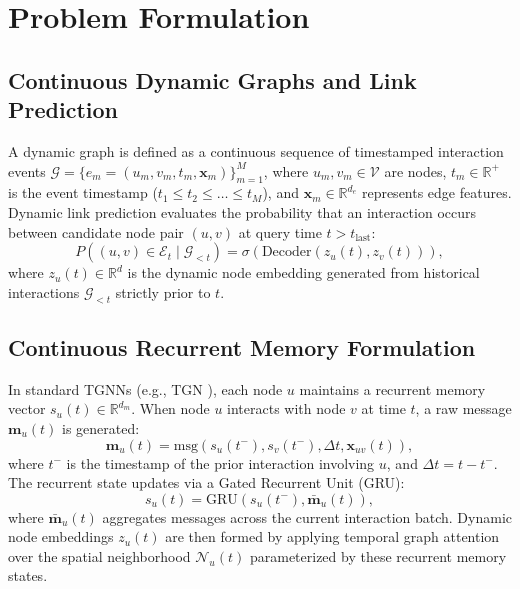 \section{Problem Formulation}
\label{sec:problem_formulation}

\subsection{Continuous Dynamic Graphs and Link Prediction}
A dynamic graph is defined as a continuous sequence of timestamped interaction events $\mathcal{G} = \{e_m = (u_m, v_m, t_m, \mathbf{x}_m)\}_{m=1}^M$, where $u_m, v_m \in \mathcal{V}$ are nodes, $t_m \in \mathbb{R}^+$ is the event timestamp ($t_1 \le t_2 \le \dots \le t_M$), and $\mathbf{x}_m \in \mathbb{R}^{d_e}$ represents edge features. Dynamic link prediction evaluates the probability that an interaction occurs between candidate node pair $(u, v)$ at query time $t > t_{\text{last}}$:
\begin{equation}
    P((u, v) \in \mathcal{E}_{t} \mid \mathcal{G}_{< t}) = \sigma(\text{Decoder}(z_u(t), z_v(t))),
\end{equation}
where $z_u(t) \in \mathbb{R}^d$ is the dynamic node embedding generated from historical interactions $\mathcal{G}_{< t}$ strictly prior to $t$.

\subsection{Continuous Recurrent Memory Formulation}
In standard TGNNs (e.g., TGN \citep{rossi2020temporal}), each node $u$ maintains a recurrent memory vector $s_u(t) \in \mathbb{R}^{d_m}$. When node $u$ interacts with node $v$ at time $t$, a raw message $\mathbf{m}_u(t)$ is generated:
\begin{equation}
    \mathbf{m}_u(t) = \text{msg}(s_u(t^-), s_v(t^-), \Delta t, \mathbf{x}_{uv}(t)),
\end{equation}
where $t^-$ is the timestamp of the prior interaction involving $u$, and $\Delta t = t - t^-$. The recurrent state updates via a Gated Recurrent Unit (GRU):
\begin{equation}
    s_u(t) = \text{GRU}(s_u(t^-), \bar{\mathbf{m}}_u(t)),
\end{equation}
where $\bar{\mathbf{m}}_u(t)$ aggregates messages across the current interaction batch. Dynamic node embeddings $z_u(t)$ are then formed by applying temporal graph attention over the spatial neighborhood $\mathcal{N}_u(t)$ parameterized by these recurrent memory states.

